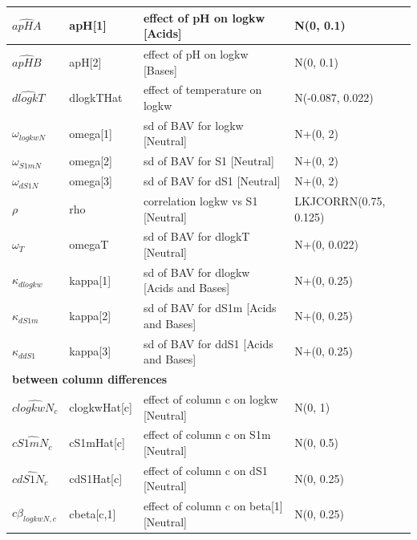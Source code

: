 \documentclass[
]{article}
\begin{document}
\begin{longtable}[t]{l|l|l|l}
\hline
\hspace{1em}$\hat{apHA}$ & apH[1] & effect of pH on logkw [Acids] & N(0, 0.1)\\
\hline
\hspace{1em}$\hat{apHB}$ & apH[2] & effect of pH on logkw [Bases] & N(0, 0.1)\\
\hline
\hspace{1em}$\hat{dlogkT}$ & dlogkTHat & effect of temperature on logkw & N(-0.087, 0.022)\\
\hline
\hspace{1em}$\omega_{logkwN}$ & omega[1] & sd of BAV for logkw [Neutral] & N+(0, 2)\\
\hline
\hspace{1em}$\omega_{S1mN}$ & omega[2] & sd of BAV for S1 [Neutral] & N+(0, 2)\\
\hline
\hspace{1em}$\omega_{dS1N}$ & omega[3] & sd of BAV for dS1 [Neutral] & N+(0, 2)\\
\hline
\hspace{1em}$\rho$ & rho & correlation logkw vs S1 [Neutral] & LKJCORRN(0.75, 0.125)\\
\hline
\hspace{1em}$\omega_T$ & omegaT & sd of BAV for dlogkT [Neutral] & N+(0, 0.022)\\
\hline
\hspace{1em}$\kappa_{dlogkw}$ & kappa[1] & sd of BAV for dlogkw [Acids and Bases] & N+(0, 0.25)\\
\hline
\hspace{1em}$\kappa_{dS1m}$ & kappa[2] & sd of BAV for dS1m [Acids and Bases] & N+(0, 0.25)\\
\hline
\hspace{1em}$\kappa_{ddS1}$ & kappa[3] & sd of BAV for ddS1 [Acids and Bases] & N+(0, 0.25)\\
\hline
\multicolumn{4}{l}{\textbf{between column differences}}\\
\hline
\hspace{1em}$\hat{clogkwN_c}$ & clogkwHat[c] & effect of column c on logkw [Neutral] & N(0, 1)\\
\hline
\hspace{1em}$\hat{cS1mN_c}$ & cS1mHat[c] & effect of column c on S1m [Neutral] & N(0, 0.5)\\
\hline
\hspace{1em}$\hat{cdS1N_c}$ & cdS1Hat[c] & effect of column c on dS1 [Neutral] & N(0, 0.25)\\
\hline
\hspace{1em}$c\beta_{logkwN,c}$ & cbeta[c,1] & effect of column c on beta[1] [Neutral] & N(0, 0.25)\\

\end{longtable}
\end{document}
